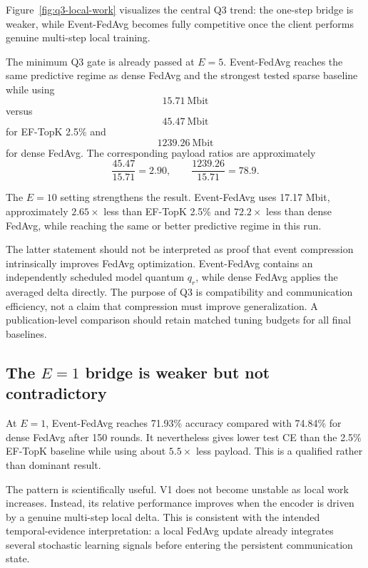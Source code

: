 Figure~\ref{fig:q3-local-work} visualizes the central Q3 trend: the one-step bridge is weaker, while Event-FedAvg becomes fully competitive once the client performs genuine multi-step local training.

\QThreeLocalWorkFigure

The minimum Q3 gate is already passed at $E=5$. Event-FedAvg reaches the same predictive regime as dense FedAvg and the strongest tested sparse baseline while using
\begin{equation}
    15.71\ \text{Mbit}
\end{equation}
versus
\begin{equation}
    45.47\ \text{Mbit}
\end{equation}
for EF-TopK 2.5\% and
\begin{equation}
    1239.26\ \text{Mbit}
\end{equation}
for dense FedAvg. The corresponding payload ratios are approximately
\begin{equation}
    \frac{45.47}{15.71}=2.90,
    \qquad
    \frac{1239.26}{15.71}=78.9.
\end{equation}

The $E=10$ setting strengthens the result. Event-FedAvg uses 17.17 Mbit, approximately $2.65\times$ less than EF-TopK 2.5\% and $72.2\times$ less than dense FedAvg, while reaching the same or better predictive regime in this run.

The latter statement should not be interpreted as proof that event compression intrinsically improves FedAvg optimization. Event-FedAvg contains an independently scheduled model quantum $q_r$, while dense FedAvg applies the averaged delta directly. The purpose of Q3 is compatibility and communication efficiency, not a claim that compression must improve generalization. A publication-level comparison should retain matched tuning budgets for all final baselines.

\subsection{The $E=1$ bridge is weaker but not contradictory}

At $E=1$, Event-FedAvg reaches 71.93\% accuracy compared with 74.84\% for dense FedAvg after 150 rounds. It nevertheless gives lower test CE than the 2.5\% EF-TopK baseline while using about $5.5\times$ less payload. This is a qualified rather than dominant result.

The pattern is scientifically useful. V1 does not become unstable as local work increases. Instead, its relative performance improves when the encoder is driven by a genuine multi-step local delta. This is consistent with the intended temporal-evidence interpretation: a local FedAvg update already integrates several stochastic learning signals before entering the persistent communication state.

